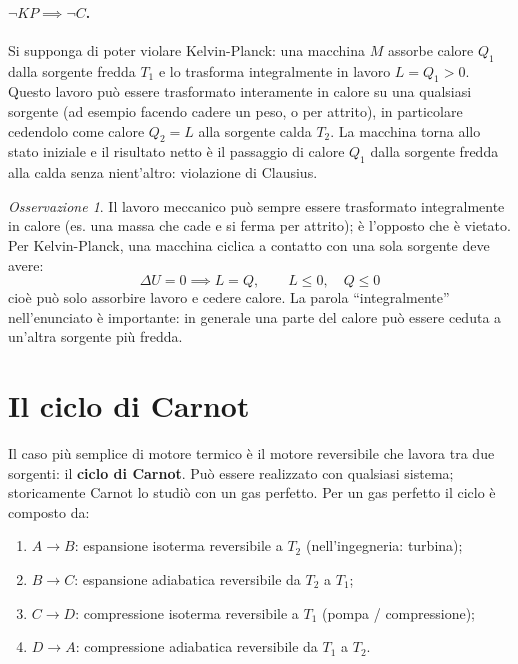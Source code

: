 \documentclass[11pt, a4paper, openright]{book}
\theoremstyle{plain}
\theoremstyle{definition}
\theoremstyle{remark}
\newtheorem{osservazione}[teorema]{Osservazione}
\begin{document}
\paragraph{$\neg KP \implies \neg C$.} Si supponga di poter violare Kelvin-Planck: una macchina $M$ assorbe calore $Q_1$ dalla sorgente fredda $T_1$ e lo trasforma integralmente in lavoro $L = Q_1 > 0$. Questo lavoro può essere trasformato interamente in calore su una qualsiasi sorgente (ad esempio facendo cadere un peso, o per attrito), in particolare cedendolo come calore $Q_2 = L$ alla sorgente calda $T_2$. La macchina torna allo stato iniziale e il risultato netto è il passaggio di calore $Q_1$ dalla sorgente fredda alla calda senza nient'altro: violazione di Clausius.

\begin{osservazione}
    Il lavoro meccanico può sempre essere trasformato integralmente in calore (es. una massa che cade e si ferma per attrito); è l'opposto che è vietato. Per Kelvin-Planck, una macchina ciclica a contatto con una sola sorgente deve avere:
    \begin{equation}
        \Delta U = 0 \implies L = Q, \qquad L \leq 0, \quad Q \leq 0
    \end{equation}
    cioè può solo assorbire lavoro e cedere calore. La parola ``integralmente'' nell'enunciato è importante: in generale una parte del calore può essere ceduta a un'altra sorgente più fredda.
\end{osservazione}

\section{Il ciclo di Carnot}
Il caso più semplice di motore termico è il motore reversibile che lavora tra due sorgenti: il \textbf{ciclo di Carnot}. Può essere realizzato con qualsiasi sistema; storicamente Carnot lo studiò con un gas perfetto. Per un gas perfetto il ciclo è composto da:
\begin{enumerate}
    \item $A \to B$: espansione isoterma reversibile a $T_2$ (nell'ingegneria: turbina);
    \item $B \to C$: espansione adiabatica reversibile da $T_2$ a $T_1$;
    \item $C \to D$: compressione isoterma reversibile a $T_1$ (pompa / compressione);
    \item $D \to A$: compressione adiabatica reversibile da $T_1$ a $T_2$.
\end{enumerate}
\end{document}
